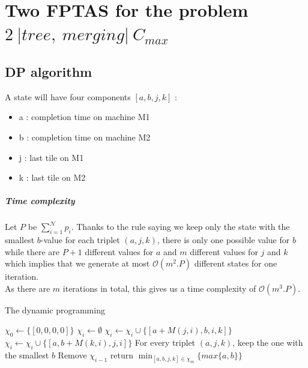 \documentclass[a4paper, 11pt]{report}
\begin{document}
\chapter{Two FPTAS for the problem $2~|tree,~merging|~C_{max}$}
	
\section{DP algorithm}

A state will have four components $[a, b, j, k]$ :
\begin{itemize}
	\item a : completion time on machine M1
	\item b : completion time on machine M2
	\item j : last tile on M1
	\item k : last tile on M2
\end{itemize}

\paragraph{Time complexity} Let $P$ be $\sum _{i = 1}^\mathcal{N} p_i$. Thanks to the rule saying we keep only the state with the smallest $b$-value for each triplet $(a, j, k)$, there is only one possible value for $b$ while there are $P+ 1$  different values for $a$ and $m$ different values for $j$ and $k$ which implies that we generate at most $\mathcal{O}(m^2.P)$ different states for one iteration.\\
As there are $m$ iterations in total, this gives us a time complexity of $\mathcal{O}(m^3.P)$.

\begin{algorithm}[H]
	\caption {The dynamic programming}
	\begin{algorithmic}
		\State $\chi_0 \leftarrow \{[0, 0, 0, 0]\}$
		  
		\State $\chi_i \leftarrow \emptyset$
		\State $\chi_i \leftarrow \chi_i \cup \{ [a + M(j, i), b, i, k] \}$ 
		\State $\chi_i \leftarrow \chi_i \cup \{ [a, b + M(k,i), j, i] \}$ 
		\EndFor
		\State For every triplet $(a, j, k)$, keep the one with the smallest $b$
		\State Remove $\chi_{i-1}$
		\EndFor
		\State return $ \min_{ [a, b, j, k] \in \chi_m } \{ max\{a, b\} \}$
	\end{algorithmic}
	\label {DP_algo}
\end{algorithm}
\end{document}
